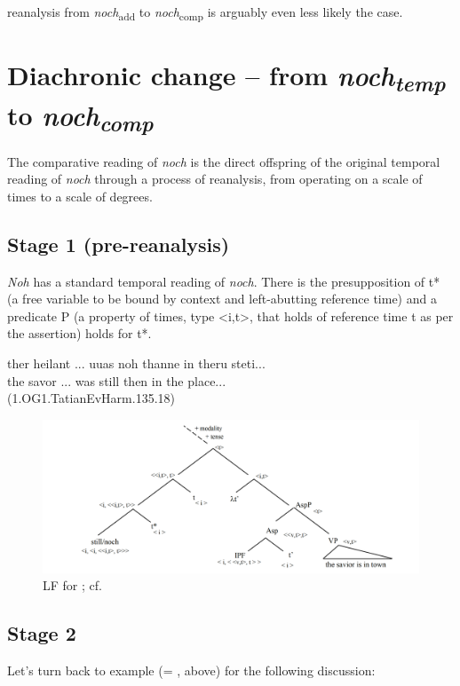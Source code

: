 \documentclass[output=paper
,modfonts
,nonflat]{langsci/langscibook}
\begin{document}
reanalysis from \textit{noch}\textsubscript{add} to \textit{noch}\textsubscript{comp} is arguably even less likely the case.



\section{Diachronic change -- from \textit{noch\textsubscript{temp}} to \textit{noch\textsubscript{comp}}}\label{sec_diachr_analysis}

The comparative reading of \textit{noch} is the direct offspring of the original temporal reading of \textit{noch} through a process of reanalysis, from operating on a scale of times to a scale of degrees.

\subsection{Stage 1 (pre-reanalysis)} \textit{Noh} has a standard temporal reading of \textit{noch}. There is the presupposition of t* (a free variable to be bound by context and left-abutting reference time) and a predicate P (a property of times, type <i,t>, that holds of reference time t as per the assertion) holds for t*.

\ea\gll ther heilant ... uuas noh thanne in theru steti...\\
       the savor ... was still then in the place...\\
(1.OG1.TatianEvHarm.135.18)\label{TEMP_jesus_noch_in_town}
\z

\begin{figure}
\includegraphics[width=1\textwidth]{figures/LF0_temp}
\caption{LF for ; cf. \citep{beck2016a_sub}}
\label{fig:LF_TEMP_jesus_noch_in_town}
\end{figure}

\subsection{Stage 2} Let's turn back to example  (= , above) for the following discussion:
\end{document}
